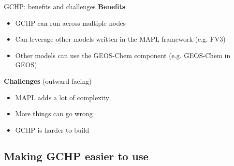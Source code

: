 \documentclass[10pt]{beamer}
\begin{document}
\begin{frame}[fragile]{GCHP: benefits and challenges }
    \textbf{Benefits}
    \footnotesize
    \begin{itemize}
        \item GCHP can run across multiple nodes
        \item Can leverage other models written in the MAPL framework (e.g. FV3)
        \item Other models can use the GEOS-Chem component (e.g. GEOS-Chem in GEOS)
    \end{itemize}
    \vfill
    \normalsize
    \textbf{Challenges} (outward facing)
    \footnotesize
    \begin{itemize}
        \item MAPL adds a lot of complexity
        \item More things can go wrong
        \item GCHP is harder to build
    \end{itemize}
\end{frame}

\subsection{Making GCHP easier to use}
\frame{\sectionpage}
\end{document}

